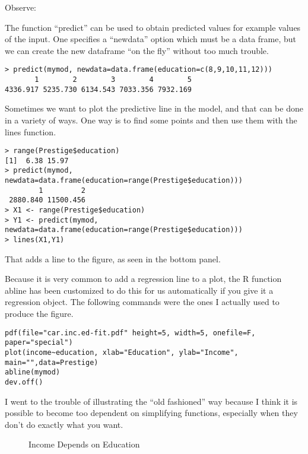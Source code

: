 Observe:

The function ``predict'' can be used to obtain predicted values
for example values of the input. One specifies a ``newdata'' option
which must be a data frame, but we can create the new dataframe ``on
the fly'' without too much trouble. 

\begin{lstlisting}
> predict(mymod, newdata=data.frame(education=c(8,9,10,11,12)))
       1        2        3        4        5 
4336.917 5235.730 6134.543 7033.356 7932.169 
\end{lstlisting}
Sometimes we want to plot the predictive line in the model, and that
can be done in a variety of ways. One way is to find some points and
then use them with the lines function.

\begin{lstlisting}
> range(Prestige$education)
[1]  6.38 15.97
> predict(mymod, newdata=data.frame(education=range(Prestige$education)))
        1         2 
 2880.840 11500.456 
> X1 <- range(Prestige$education)
> Y1 <- predict(mymod, newdata=data.frame(education=range(Prestige$education)))
> lines(X1,Y1)
\end{lstlisting}
That adds a line to the figure, as seen in the bottom panel.

Because it is very common to add a regression line to a plot, the
R function abline has been customized to do this for us automatically
if you give it a regression object. The following commands were the
ones I actually used to produce the figure. 

\begin{lstlisting}[breaklines=true]
pdf(file="car.inc.ed-fit.pdf" height=5, width=5, onefile=F, paper="special")
plot(income~education, xlab="Education", ylab="Income", main="",data=Prestige)
abline(mymod)
dev.off()
\end{lstlisting}
I went to the trouble of illustrating the ``old fashioned'' way
because I think it is possible to become too dependent on simplifying
functions, especially when they don't do exactly what you want.

\begin{figure}
\begin{centering}
\par\end{centering}
\begin{centering}
\par\end{centering}
\caption{Income Depends on Education\label{fig:Income-DependsonEduc}}
\end{figure}

